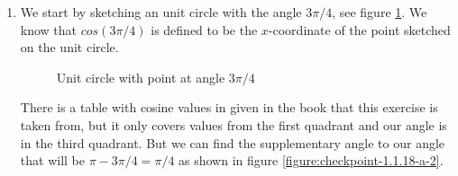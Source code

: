 \begin{enumerate}[label=(\alph*)]
  \item
    We start by sketching an unit circle with the angle $ 3\pi/4 $, see figure \ref{figure:checkpoint-1.1.18-a-1}. We know that $ cos(3\pi/4) $ is defined to be the $ x $-coordinate of the point sketched on the unit circle.

    \begin{figure}[H]
      \centering
      \caption{Unit circle with point at angle $ 3\pi/4 $}
      \label{figure:checkpoint-1.1.18-a-1}
    \end{figure}

    There is a table with cosine values in given in the book that this exercise is taken from, but it only covers values from the first quadrant and our angle is in the third quadrant. But we can find the supplementary angle to our angle that will be $ \pi - 3\pi/4 = \pi/4 $ as shown in figure \ref{figure:checkpoint-1.1.18-a-2}.

    \begin{figure}[H]
      \centering
\end{figure}
\end{enumerate}
